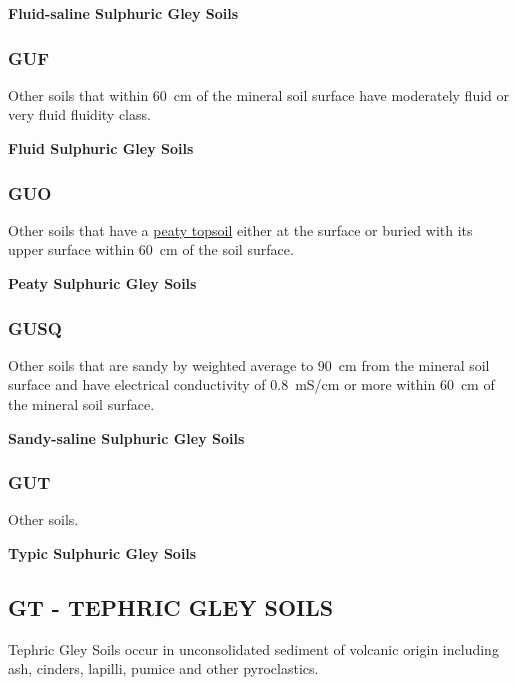 \documentclass[
  letterpaper,
  DIV=11,
  numbers=noendperiod]{scrreprt}
\begin{document}
\textbf{Fluid-saline Sulphuric Gley Soils}

\hypertarget{sec-key-GUF}{%
\subsubsection{\texorpdfstring{\textbf{GUF}}{GUF}}\label{sec-key-GUF}}

Other soils that within 60~cm of the mineral soil surface have
moderately fluid or very fluid fluidity class.

\textbf{Fluid Sulphuric Gley Soils}

\hypertarget{sec-key-GUO}{%
\subsubsection{\texorpdfstring{\textbf{GUO}}{GUO}}\label{sec-key-GUO}}

Other soils that have a \protect\hyperlink{sec-diag-pts}{peaty topsoil}
either at the surface or buried with its upper surface within 60~cm of
the soil surface.

\textbf{Peaty Sulphuric Gley Soils}

\hypertarget{sec-key-GUSQ}{%
\subsubsection{\texorpdfstring{\textbf{GUSQ}}{GUSQ}}\label{sec-key-GUSQ}}

Other soils that are sandy by weighted average to 90~cm from the mineral
soil surface and have electrical conductivity of 0.8~mS/cm or more
within 60~cm of the mineral soil surface.

\textbf{Sandy-saline Sulphuric Gley Soils}

\hypertarget{sec-key-GUT}{%
\subsubsection{\texorpdfstring{\textbf{GUT}}{GUT}}\label{sec-key-GUT}}

Other soils.

\textbf{Typic Sulphuric Gley Soils}

\hypertarget{sec-GT}{%
\subsection{\texorpdfstring{\textbf{GT} - TEPHRIC GLEY
SOILS}{GT - TEPHRIC GLEY SOILS}}\label{sec-GT}}

Tephric Gley Soils occur in unconsolidated sediment of volcanic origin
including ash, cinders, lapilli, pumice and other pyroclastics.
\end{document}
